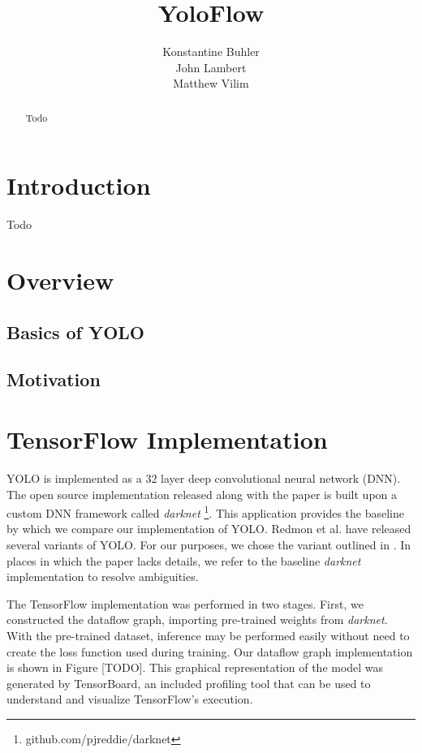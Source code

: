 \documentclass{sig-alternate-05-2015}
\begin{document}
\title{YoloFlow}

\author{
\alignauthor
Konstantine Buhler\\
\alignauthor
John Lambert\\
\alignauthor
Matthew Vilim\\
}
\maketitle
\begin{abstract}
Todo
\end{abstract}

\section{Introduction}
Todo

\section{Overview}
\subsection{Basics of YOLO}

\subsection{Motivation}

\section{TensorFlow Implementation}
YOLO is implemented as a 32 layer deep convolutional neural network (DNN). The open source implementation released along with the paper is built upon a custom DNN framework called \textit{darknet} \footnote{github.com/pjreddie/darknet}. This application provides the baseline by which we compare our implementation of YOLO. Redmon et al. have released several variants of YOLO. For our purposes, we chose the variant outlined in \cite{redmon:yolo}. In places in which the paper lacks details, we refer to the baseline \textit{darknet} implementation to resolve ambiguities.

The TensorFlow implementation was performed in two stages. First, we constructed the dataflow graph, importing pre-trained weights from \textit{darknet}. With the pre-trained dataset, inference may be performed easily without need to create the loss function used during training. Our dataflow graph implementation is shown in Figure [TODO]. This graphical representation of the model was generated by TensorBoard, an included profiling tool that can be used to understand and visualize TensorFlow's execution.
\end{document}
